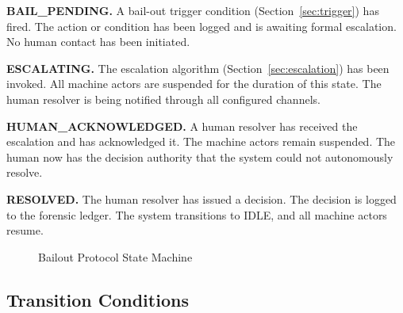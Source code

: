 \medskip\noindent\textbf{BAIL\_PENDING.} A bail-out trigger condition (Section~\ref{sec:trigger}) has fired. The action or condition has been logged and is awaiting formal escalation. No human contact has been initiated.

\medskip\noindent\textbf{ESCALATING.} The escalation algorithm (Section~\ref{sec:escalation}) has been invoked. All machine actors are suspended for the duration of this state. The human resolver is being notified through all configured channels.

\medskip\noindent\textbf{HUMAN\_ACKNOWLEDGED.} A human resolver has received the escalation and has acknowledged it. The machine actors remain suspended. The human now has the decision authority that the system could not autonomously resolve.

\medskip\noindent\textbf{RESOLVED.} The human resolver has issued a decision. The decision is logged to the forensic ledger. The system transitions to IDLE, and all machine actors resume.

\begin{figure}[H]
\centering
{}
\caption{Bailout Protocol State Machine}
\label{fig:state-machine}
\end{figure}

\subsection{Transition Conditions}
\label{sec:transitions}

